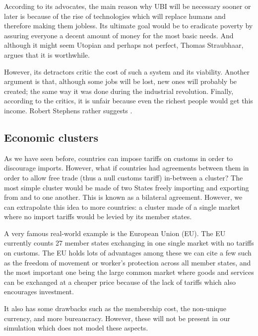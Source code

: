 \documentclass[20pt]{article}
\begin{document}
    According to its advocates, the main reason why UBI will be necessary sooner or later is because of the rise of technologies which will replace humans and therefore making them jobless. Its ultimate goal would be to eradicate poverty by assuring everyone a decent amount of money for the most basic needs. And although it might seem Utopian and perhaps not perfect, Thomas Straubhaar, argues that it is worthwhile.\cite{straubhaar2017economics}
    
    However, its detractors critic the cost of such a system and its viability. Another argument is that, although some jobs will be lost, new ones will probably be created; the same way it was done during the industrial revolution. Finally, according to the critics, it is unfair because even the richest people would get this income. Robert Stephens rather suggests  \cite{stephens2019universal}.

    
\subsection{Economic clusters}
    As we have seen before, countries can impose tariffs on customs in order to discourage imports. However, what if countries had agreements between them in order to allow free trade (thus a null customs tariff) in-between a cluster? The most simple cluster would be made of two States freely importing and exporting from and to one another. This is known as a bilateral agreement. However, we can extrapolate this idea to more countries: a cluster made of a single market where no import tariffs would be levied by its member states.
    
    A very famous real-world example is the European Union (EU). The EU currently counts 27 member states exchanging in one single market with no tariffs on customs. The EU holds lots of advantages among these we can cite a few such as the freedom of movement or worker's protection across all member states, and the most important one being the large common market where goods and services can be exchanged at a cheaper price because of the lack of tariffs which also encourages investment.
    
    It also has some drawbacks such as the membership cost, the non-unique currency, and more bureaucracy. However, these will not be present in our simulation which does not model these aspects.
    
\end{document}
